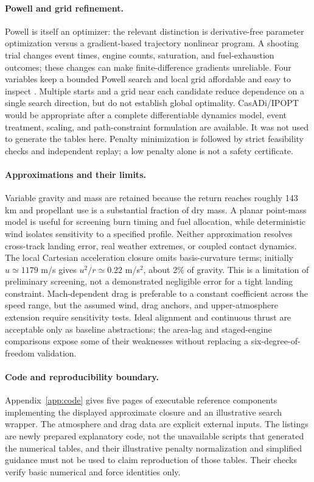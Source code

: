 \documentclass[11pt,a4paper]{article}
\begin{document}
\paragraph{Powell and grid refinement.}
Powell is itself an optimizer: the relevant distinction is derivative-free parameter optimization versus a gradient-based trajectory nonlinear program. A shooting trial changes event times, engine counts, saturation, and fuel-exhaustion outcomes; these changes can make finite-difference gradients unreliable. Four variables keep a bounded Powell search and local grid affordable and easy to inspect \cite{powell,scipy}. Multiple starts and a grid near each candidate reduce dependence on a single search direction, but do not establish global optimality. CasADi/IPOPT would be appropriate after a complete differentiable dynamics model, event treatment, scaling, and path-constraint formulation are available. It was not used to generate the tables here. Penalty minimization is followed by strict feasibility checks and independent replay; a low penalty alone is not a safety certificate.

\paragraph{Approximations and their limits.}
Variable gravity and mass are retained because the return reaches roughly 143 km and propellant use is a substantial fraction of dry mass. A planar point-mass model is useful for screening burn timing and fuel allocation, while deterministic wind isolates sensitivity to a specified profile. Neither approximation resolves cross-track landing error, real weather extremes, or coupled contact dynamics. The local Cartesian acceleration closure omits basis-curvature terms; initially $u\simeq1179$ m/s gives $u^2/r\simeq0.22$ m/s$^2$, about 2\% of gravity. This is a limitation of preliminary screening, not a demonstrated negligible error for a tight landing constraint. Mach-dependent drag is preferable to a constant coefficient across the speed range, but the assumed wind, drag anchors, and upper-atmosphere extension require sensitivity tests. Ideal alignment and continuous thrust are acceptable only as baseline abstractions; the area-lag and staged-engine comparisons expose some of their weaknesses without replacing a six-degree-of-freedom validation.

\paragraph{Code and reproducibility boundary.}
Appendix~\ref{app:code} gives five pages of executable reference components implementing the displayed approximate closure and an illustrative search wrapper. The atmosphere and drag data are explicit external inputs. The listings are newly prepared explanatory code, not the unavailable scripts that generated the numerical tables, and their illustrative penalty normalization and simplified guidance must not be used to claim reproduction of those tables. Their checks verify basic numerical and force identities only.
\end{document}
